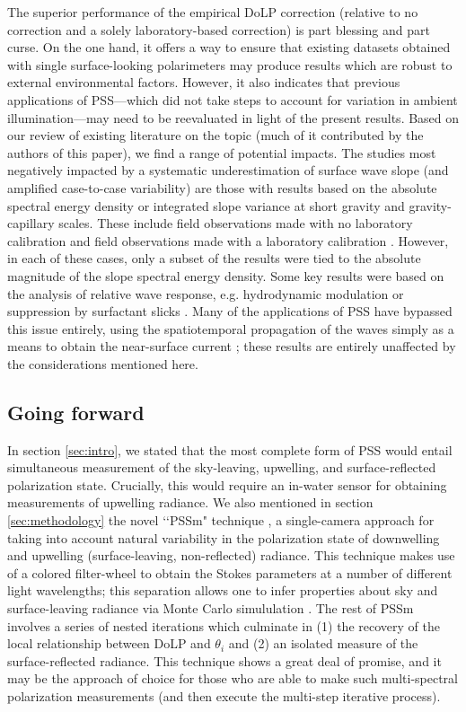 \documentclass[letterpaper,journal]{IEEEtran}
\begin{document}
The superior performance of the empirical DoLP correction (relative to no correction and a solely laboratory-based correction) is part blessing and part curse. On the one hand, it offers a way to ensure that existing datasets obtained with single surface-looking polarimeters may produce results which are robust to external environmental factors. However, it also indicates that previous applications of PSS---which did not take steps to account for variation in ambient illumination---may need to be reevaluated in light of the present results. Based on our review of existing literature on the topic (much of it contributed by the authors of this paper), we find a range of potential impacts. The studies most negatively impacted by a systematic underestimation of surface wave slope (and amplified case-to-case variability) are those with results based on the absolute spectral energy density or integrated slope variance at short gravity and gravity-capillary scales. These include field observations made with no laboratory calibration \cite{Laxague2015} and field observations made with a laboratory calibration \cite{Zappa2012,Laxague2018b}. However, in each of these cases, only a subset of the results were tied to the absolute magnitude of the slope spectral energy density. Some key results were based on the analysis of relative wave response, e.g. hydrodynamic modulation \cite{Laxague2017a} or suppression by surfactant slicks \cite{laxague_suppression_2024}. Many of the applications of PSS have bypassed this issue entirely, using the spatiotemporal propagation of the waves simply as a means to obtain the near-surface current \cite{laxague2017b,Laxague2018a,Laxague2020a,Laxague2020b}; these results are entirely unaffected by the considerations mentioned here.

\subsection{Going forward}
\label{sec:forward}

In section \ref{sec:intro}, we stated that the most complete form of PSS would entail simultaneous measurement of the sky-leaving, upwelling, and surface-reflected polarization state. Crucially, this would require an in-water sensor for obtaining measurements of upwelling radiance. We also mentioned in section \ref{sec:methodology} the novel \lq\lq PSSm" technique \cite{malinowski_surface_2024}, a single-camera approach for taking into account natural variability in the polarization state of downwelling and upwelling (surface-leaving, non-reflected) radiance. This technique makes use of a colored filter-wheel to obtain the Stokes parameters at a number of different light wavelengths; this separation allows one to infer properties about sky and surface-leaving radiance via Monte Carlo simululation \cite{foster_characterization_2015,foster_polarized_2016}. The rest of PSSm involves a series of nested iterations which culminate in (1) the recovery of the local relationship between DoLP and $\theta_i$ and (2) an isolated measure of the surface-reflected radiance. This technique shows a great deal of promise, and it may be the approach of choice for those who are able to make such multi-spectral polarization measurements (and then execute the multi-step iterative process).
\end{document}
